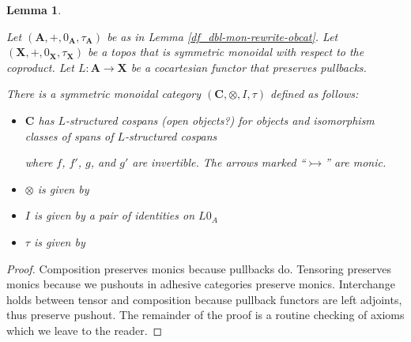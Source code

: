 \documentclass[]{amsart}
\newcommand{\A}{\cat{A}}
\newcommand{\C}{\cat{C}}
\newcommand{\X}{\cat{X}}
\newcommand{\cat}[1]{\mathbf{#1}}
\newcommand{\from}{\colon}
\newcommand{\diagram}[1]{\raisebox{-0.5\height}{\texttt{[image: \#1]}}}
\newcommand{\MMonRewrite}{ \mathbb{M}\mathbf{on}\mathbb{R}\mathbf{ewrite} }
\newcommand{\edit}[1]{\textcolor{editcolour}{(#1)}}
\newtheorem{lemma}[theorem]{Lemma}
\theoremstyle{remark}
\theoremstyle{definition}
\begin{document}
\begin{lemma} \label{thm:mon-rewrite-arrcat}
  
  Let $ (\A , + , 0_\A , \tau_\A ) $ be as in Lemma
  \ref{df_dbl-mon-rewrite-obcat}. Let $ (\X , + , 0_\X , \tau_\X ) $
  be a topos that is symmetric monoidal with respect to the
  coproduct. Let $ L \from \A \to \X $ be a cocartesian functor that
  preserves pullbacks.
	
  There is a symmetric monoidal category
  $ ( \C , \otimes , I , \tau ) $ defined as follows:
  \begin{itemize}
   \item $ \C $ has $ L $-structured cospans \edit{open objects?}
          for objects and isomorphism classes of spans of
          $ L $-structured cospans
          \begin{center}
            \diagram{diag_lr_dbl-mon-rewrite-2cell}
          \end{center}
          where $ f $, $ f' $, $ g $, and $ g' $ are invertible. The
          arrows marked ``$ \rightarrowtail $'' are monic.
   \item $ \otimes $ is given by
         \begin{center}
           \diagram{diag_lr_dbl-rewrite-tensor}
         \end{center}
   \item $ I $ is given by a pair of identities on $ L0_A $
   \item $ \tau $ is given by
        \begin{center}
          \diagram{diag_lr_dbl-rewrite-braiding}
        \end{center}
   \end{itemize}
\end{lemma}
\begin{proof}
  
  Composition preserves monics because pullbacks do. Tensoring
  preserves monics because we pushouts in adhesive categories preserve
  monics. Interchange holds between tensor and composition because
  pullback functors are left adjoints, thus preserve pushout. The
  remainder of the proof is a routine checking of axioms which we
  leave to the reader.
 
\end{proof}

\end{document}
